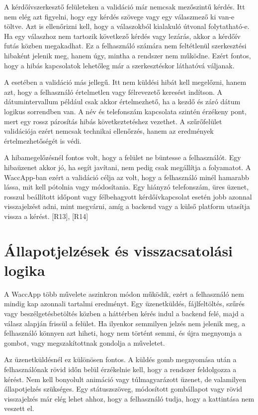 A kérdőívszerkesztő felületeken a validáció már nemcsak mezőszintű kérdés. Itt nem elég azt figyelni, hogy egy kérdés szövege vagy egy válaszmező ki van-e töltve. Azt is ellenőrizni kell, hogy a válaszokból kialakuló útvonal folytatható-e. Ha egy válaszhoz nem tartozik következő kérdés vagy lezárás, akkor a kérdőív futás közben megakadhat. Ez a felhasználó számára nem feltétlenül szerkesztési hibaként jelenik meg, hanem úgy, mintha a rendszer nem működne. Ezért fontos, hogy a hibás kapcsolatok lehetőleg már a szerkesztéskor láthatóvá váljanak.

A  esetében a validáció más jellegű. Itt nem küldési hibát kell megelőzni, hanem azt, hogy a felhasználó értelmetlen vagy félrevezető keresést indítson. A dátumintervallum például csak akkor értelmezhető, ha a kezdő és záró dátum logikus sorrendben van. A név és telefonszám kapcsolata szintén érzékeny pont, mert egy rossz párosítás hibás következtetéshez vezethet. A szűrőfelület validációja ezért nemcsak technikai ellenőrzés, hanem az eredmények értelmezhetőségét is védi.

A hibamegelőzésnél fontos volt, hogy a felület ne büntesse a felhasználót. Egy hibaüzenet akkor jó, ha segít javítani, nem pedig csak megállítja a folyamatot. A WaccApp-ban ezért a validáció célja az volt, hogy a felhasználó minél hamarabb lássa, mit kell pótolnia vagy módosítania. Egy hiányzó telefonszám, üres üzenet, rosszul beállított időpont vagy félbehagyott kérdőívkapcsolat esetén jobb azonnal visszajelzést adni, mint megvárni, amíg a backend vagy a külső platform utasítja vissza a kérést. [R13], [R14]

\section{Állapotjelzések és visszacsatolási logika}

A WaccApp több művelete aszinkron módon működik, ezért a felhasználó nem mindig kap azonnali tartalmi eredményt. Egy üzenetküldés, fájlfeltöltés, szűrés vagy beszélgetésbetöltés közben a háttérben kérés indul a backend felé, majd a válasz alapján frissül a felület. Ha ilyenkor semmilyen jelzés nem jelenik meg, a felhasználó könnyen azt hiheti, hogy nem történt semmi, és újra megnyomja a gombot, vagy megszakítottnak gondolja a műveletet.

Az üzenetküldésnél ez különösen fontos. A küldés gomb megnyomása után a felhasználónak rövid időn belül érzékelnie kell, hogy a rendszer feldolgozza a kérést. Nem kell bonyolult animáció vagy túlmagyarázott üzenet, de valamilyen állapotjelzés szükséges. Egy státuszszöveg, módosított gombállapot vagy rövid visszajelzés már elég lehet ahhoz, hogy a felhasználó tudja, hogy a kattintása nem veszett el.

